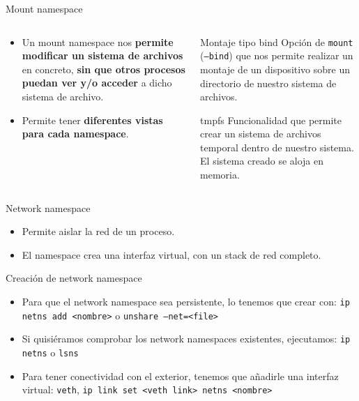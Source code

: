 \documentclass[aspectratio=169,xcolor=dvipsnames]{beamer}
\begin{document}
    \begin{frame}{Mount namespace}
        \begin{columns}
            \begin{column}{0.5\textwidth}
                \begin{itemize}
                    \item Un mount namespace nos \textbf{permite modificar un sistema de archivos} en concreto, \textbf{sin que otros procesos puedan ver y/o acceder} a dicho sistema de archivo.
                    \item Permite tener \textbf{diferentes vistas para cada namespace}.
                \end{itemize}
            \end{column}
        
            \begin{column}{0.5\textwidth}
                \begin{alertblock}{Montaje tipo bind}
                    Opción de \texttt{mount} (\texttt{--bind}) que nos permite realizar un montaje de un dispositivo sobre un directorio de nuestro sistema de archivos.
                \end{alertblock}
                
                \begin{alertblock}{tmpfs}
                    Funcionalidad que permite crear un sistema de archivos temporal dentro de nuestro sistema. El sistema creado se aloja en memoria.
                \end{alertblock}
            \end{column}
        \end{columns}
    \end{frame}
    
    \begin{frame}{Network namespace}
        \begin{itemize}
            \item Permite aislar la red de un proceso.
            \item El namespace crea una interfaz virtual, con un stack de red completo.
        \end{itemize}
        
        \begin{exampleblock}{Creación de network namespace}
            \begin{itemize}
                \item Para que el network namespace sea persistente, lo tenemos que crear con: \texttt{ip netns add <nombre>} o \texttt{unshare --net=<file>}
                \item Si quisiéramos comprobar los network namespaces existentes, ejecutamos: \texttt{ip netns} o \texttt{lsns}
                \item Para tener conectividad con el exterior, tenemos que añadirle una interfaz virtual: \texttt{veth}, \texttt{ip link set <veth link> netns <nombre>}
            \end{itemize}
        \end{exampleblock}
    \end{frame}
    
\end{document}

